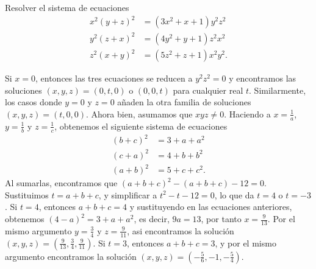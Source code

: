 \begin{example}
    Resolver el sistema de ecuaciones
    \begin{align*}
        x^2 (y + z)^2 &= (3x^2 + x + 1) y^2 z^2\\
        y^2 (z + x)^2 &= (4y^2 + y + 1) z^2 x^2\\
        z^2 (x + y)^2 &= (5z^2 + z + 1) x^2 y^2.
    \end{align*}
\end{example}
\begin{solution}
    Si $x = 0$, entonces las tres ecuaciones se reducen a $y^2 z^2 = 0$ y encontramos las soluciones $(x, y, z) = (0, t, 0)$ o $(0, 0, t)$ para cualquier real $t$.
    Similarmente, los casos donde $y = 0$ y $z = 0$ añaden la otra familia de soluciones $(x, y , z) = (t, 0, 0)$.
    Ahora bien, asumamos que $xyz \neq 0$.
    Haciendo a $x = \frac{1}{a}$, $y = \frac{1}{b}$ y $z = \frac{1}{c}$, obtenemos el siguiente sistema de ecuaciones
    \begin{align*}
        (b + c)^2 &= 3 + a + a^2\\
        (c + a)^2 &= 4 + b + b^2\\
        (a + b)^2 &= 5 + c + c^2.
    \end{align*}
    Al sumarlas, encontramos que $(a + b + c)^2 - (a + b + c) - 12 = 0$.
    Sustituimos $t = a + b + c$, y simplificar a $t^2 - t - 12 = 0$, lo que da $t = 4$ o $t = -3$.
    Si $t = 4$, entonces $a + b + c = 4$ y sustituyendo en las ecuaciones anteriores, obtenemos $(4 - a)^2 = 3 + a + a^2$, es decir, $9a = 13$, por tanto $x = \frac{9}{13}$.
    Por el mismo argumento $y = \frac{3}{4}$ y $z = \frac{9}{11}$, asi encontramos la solución $(x,y,z) = \left(\frac{9}{13}, \frac{3}{4}, \frac{9}{11}\right)$.
    Si $t = 3$, entonces $a + b + c = 3$, y por el mismo argumento encontramos la solución $(x,y,z) = \left(-\frac{5}{6}, -1, -\frac{5}{4}\right)$.
\end{solution}

